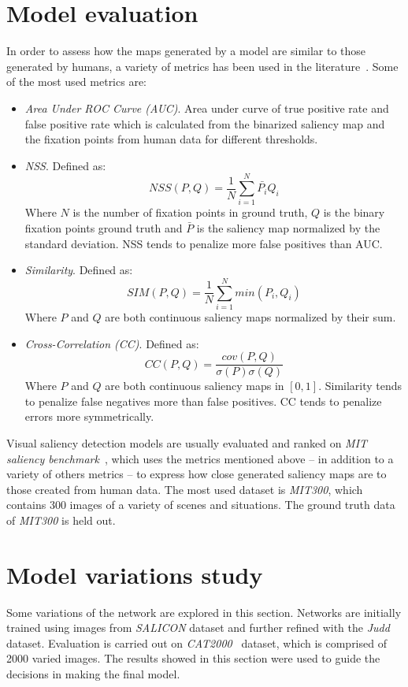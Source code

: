 \documentclass[conference]{IEEEtran}
\begin{document}
\section{Model evaluation}
\label{sec:metrics}
In order to assess how the maps generated by a model are similar to those
generated by humans, a variety of metrics has been used in the
literature~\cite{judd_2016}.
Some of the most used metrics are:
\begin{itemize}
    \item \emph{Area Under ROC Curve (AUC)}.
    Area under curve of true positive rate and false positive rate which is
    calculated from the binarized saliency map and the fixation points
    from human data for different thresholds.

    \item \emph{NSS}.
    Defined as:
	$$NSS(P, Q) = \frac{1}{N}\sum\limits_{i=1}^N{\bar{P_{i}}Q_{i}}$$
    Where $N$ is the number of fixation points in ground truth,
    $Q$ is the binary fixation points ground truth and $\bar{P}$ is the
    saliency map normalized by the standard deviation.
    NSS tends to penalize more false positives than AUC.

    \item \emph{Similarity}.
    Defined as:
	$$SIM(P, Q) = \frac{1}{N}\sum\limits_{i=1}^N{min(P_i, Q_i)}$$
    Where $P$ and $Q$ are both continuous saliency maps normalized
    by their sum.

    \item \emph{Cross-Correlation (CC)}.
    Defined as:
	$$CC(P, Q) = \frac{cov(P,Q)}{\sigma(P)\sigma(Q)}$$
    Where $P$ and $Q$ are both continuous saliency maps in $[0, 1]$.
    Similarity tends to penalize false negatives more than false positives.
    CC tends to penalize errors more symmetrically.
\end{itemize}

Visual saliency detection models are usually evaluated and ranked on
\emph{MIT saliency benchmark}~\cite{mit_sal_bm}, which uses the metrics
mentioned above -- in addition to a variety of others metrics --
to express how close generated saliency maps are to those created
from human data.
The most used dataset is \emph{MIT300},
which contains $300$ images of a variety of scenes and situations.
The ground truth data of \emph{MIT300} is held out.

\section{Model variations study}
Some variations of the network are explored in this section.
Networks are initially trained using images from \emph{SALICON} dataset
and further refined with the \emph{Judd} dataset.
Evaluation is carried out on \emph{CAT2000}~\cite{cat2000} dataset,
which is comprised of 2000 varied images.
The results showed in this section were used to guide the decisions in
making the final model.
\end{document}
